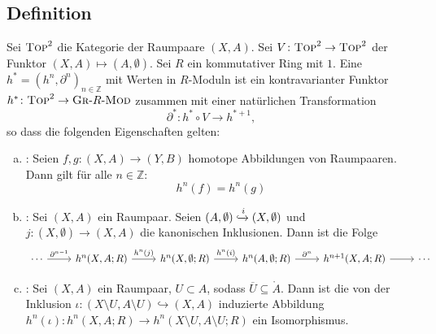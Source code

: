 \subsection[Definition: Verallgemeinerte Kohomologietheorie]{Definition} %
\label{sub:12}
Sei $\textsc{Top}^2$ die Kategorie der Raumpaare $(X,A)$. Sei $V \colon \textsc{Top}^2 \to \textsc{Top}^2$ der Funktor $(X,A) \mapsto(A,\emptyset)$. Sei $R$ ein kommutativer Ring mit $1$. Eine 
 $h^* = (h^n, \partial^n)_{n \in \mathds{Z}}$ mit Werten in $R$-Moduln ist ein kontravarianter Funktor 
$h^* \colon \textsc{Top}^2 \to \textsc{Gr}\text{-}R\text{-}\textsc{Mod}$ zusammen mit einer natürlichen Transformation 
\[
	\partial^* \colon h^* \circ V \to h^{*+1},
\]
so dass die folgenden Eigenschaften gelten:
\begin{enumerate}[a)]
	\item {}: Seien $f,g \colon (X,A) \to (Y,B)$ homotope Abbildungen von Raumpaaren. Dann gilt für alle $n \in \mathds{Z}$: 
	\[
		h^n(f)= h^n(g)
	\]
	\item {}: Sei $(X,A)$ ein Raumpaar. Seien $(A,\emptyset) \xhookrightarrow{i}(X,\emptyset)$ und $j \colon (X,\emptyset) \to (X,A)$ die 
	kanonischen Inklusionen. Dann ist die Folge 
	\[
		\begin{tikzcd}
			\cdots \rar["\partial^{n-1}"] & h^n(X,A;R) \rar["h^{n}(j)"] & h^n (X,\emptyset;R) \rar["h^n(i)"] & h^n(A, \emptyset;R) \rar["\partial^n"] & h^{n+1}(X,A;R) \rar & 
			\cdots
		\end{tikzcd}
	\]
	\item {}: Sei $(X,A)$ ein Raumpaar, $U \subset A$, sodass $\overline{U} \subseteq \mathring{A}$. Dann ist die von der Inklusion 
	$\iota \colon (X \setminus U, A \setminus U) \hookrightarrow (X,A)$ induzierte Abbildung $h^n(\iota) \colon h^n(X,A;R) \to h^n(X \setminus U, A \setminus U;R)$ ein Isomorphismus.
\end{enumerate}
